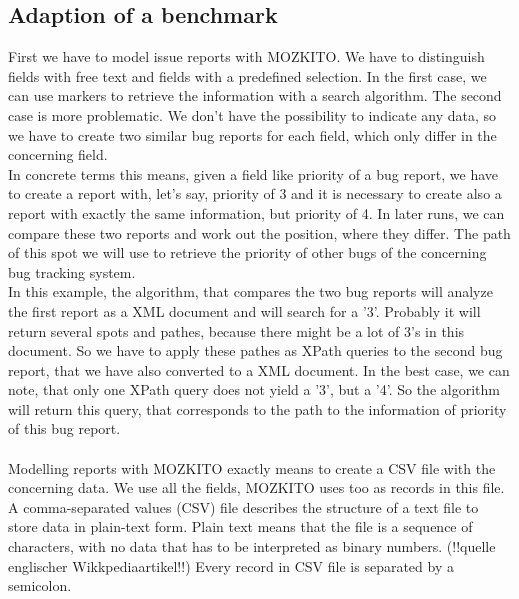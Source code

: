 \subsection{Adaption of a benchmark}
First we have to model issue reports with MOZKITO. We have to distinguish fields with free text and fields with a predefined selection. In the first case, we can use markers to retrieve the information with a search algorithm. The second case is more problematic. We don't have the possibility to indicate any data, so we have to create two similar bug reports for each field, which only differ in the concerning field. \\ In concrete terms this means, given a field like priority of a bug report, we have to create a report with, let's say, priority of 3 and it is necessary to create also a report with exactly the same information, but priority of 4. In later runs, we can compare these two reports and work out the position, where they differ. The path of this spot we will use to retrieve the priority of other bugs of the concerning bug tracking system. \\In this example, the algorithm, that compares the two bug reports will analyze the first report as a XML document and will search for a '3'. Probably it will return several spots and pathes, because there might be a lot of 3's in this document. So we have to apply these pathes as XPath queries to the second bug report, that we have also converted to a XML document. In the best case, we can note, that only one XPath query does not yield a '3', but a '4'. So the algorithm will return this query, that corresponds to the path to the information of priority of this bug report. \\ \\ Modelling reports with MOZKITO exactly means to create a CSV file with the concerning data. We use all the fields, MOZKITO uses too as records in this file. A comma-separated values (CSV) file describes the structure of a text file to store data in plain-text form. Plain text means that the file is a sequence of characters, with no data that has to be interpreted as binary numbers. (!!quelle englischer Wikkpediaartikel!!) Every record in CSV file is separated by a semicolon. 
